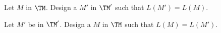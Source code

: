   \begin{tightlist}
    \item Let $M$ in $\TM$. Design a $M'$ in $\TM'$ such that $L(M') = L(M)$.
    \item Let $M'$ be in $\TM'$.
    Design a $M$ in $\TM$ such that $L(M) = L(M')$.
  \end{tightlist}
